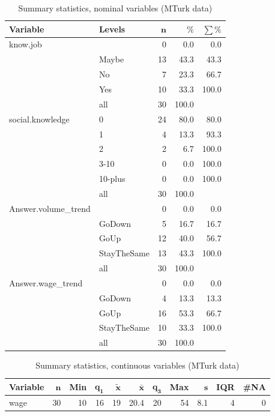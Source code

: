 \documentclass[a4paper,10pt]{article}\usepackage[]{graphicx}\usepackage[]{color}
\begin{document}
\begin{table}[ht]
\centering
{\footnotesize
\begin{tabular}{ll|rrr}
 \textbf{Variable} & \textbf{Levels} & $\mathbf{n}$ & $\mathbf{\%}$ & $\mathbf{\sum \%}$ \\ 
  \hline
know.job &  & 0 & 0.0 & 0.0 \\ 
   & Maybe & 13 & 43.3 & 43.3 \\ 
   & No & 7 & 23.3 & 66.7 \\ 
   & Yes & 10 & 33.3 & 100.0 \\ 
   \hline
 & all & 30 & 100.0 &  \\ 
   \hline
\hline
social.knowledge & 0 & 24 & 80.0 & 80.0 \\ 
   & 1 & 4 & 13.3 & 93.3 \\ 
   & 2 & 2 & 6.7 & 100.0 \\ 
   & 3-10 & 0 & 0.0 & 100.0 \\ 
   & 10-plus & 0 & 0.0 & 100.0 \\ 
   \hline
 & all & 30 & 100.0 &  \\ 
   \hline
\hline
Answer.volume\_trend &  & 0 & 0.0 & 0.0 \\ 
   & GoDown & 5 & 16.7 & 16.7 \\ 
   & GoUp & 12 & 40.0 & 56.7 \\ 
   & StayTheSame & 13 & 43.3 & 100.0 \\ 
   \hline
 & all & 30 & 100.0 &  \\ 
   \hline
\hline
Answer.wage\_trend &  & 0 & 0.0 & 0.0 \\ 
   & GoDown & 4 & 13.3 & 13.3 \\ 
   & GoUp & 16 & 53.3 & 66.7 \\ 
   & StayTheSame & 10 & 33.3 & 100.0 \\ 
   \hline
 & all & 30 & 100.0 &  \\ 
   \hline
\hline
\end{tabular}
}
\caption{Summary statistics, nominal variables (MTurk data)} 
\label{tab1:13-1020}
\end{table}
\begin{table}[ht]
\centering
{\footnotesize
\begin{tabular}{lrrrrrrrrrr}
 \textbf{Variable} & $\mathbf{n}$ & \textbf{Min} & $\mathbf{q_1}$ & $\mathbf{\widetilde{x}}$ & $\mathbf{\bar{x}}$ & $\mathbf{q_3}$ & \textbf{Max} & $\mathbf{s}$ & \textbf{IQR} & \textbf{\#NA} \\ 
  \hline
wage & 30 & 10 & 16 & 19 & 20.4 & 20 & 54 & 8.1 & 4 & 0 \\ 
  \end{tabular}
}
\caption{Summary statistics, continuous variables (MTurk data)} 
\label{tab2:13-1020}
\end{table}
\end{document}
